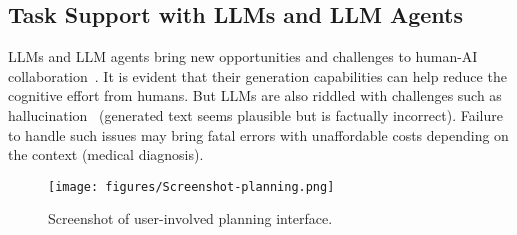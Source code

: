 \subsection{Task Support with LLMs and LLM Agents}
\label{sec-rel-LLM-agent}
LLMs and LLM agents bring new opportunities and challenges to human-AI collaboration~\cite{bommasani2021opportunities}. 
It is evident that their generation capabilities can help reduce the cognitive effort from humans. %
But LLMs are also riddled with challenges such as hallucination~\cite{ji2023survey} (\ie generated text seems plausible but is factually incorrect). 
Failure to handle such issues may bring fatal errors with unaffordable costs depending on the context (\eg medical diagnosis). 

\begin{figure*}[h]
    \centering
    \texttt{[image: figures/Screenshot-planning.png]}
    \caption{Screenshot of user-involved planning interface.} 
    \label{fig:planning}
\end{figure*}

